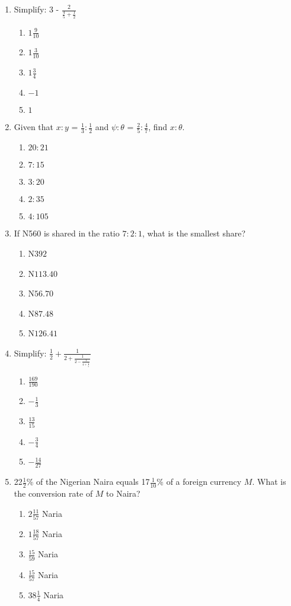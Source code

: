 \begin{multicols}{2}
\begin{enumerate}[label={\arabic*.}]
\begin{enumerate}[label={\Alph*.}]
    \end{enumerate}
\item Simplify: 3 - \(\frac{2}{\frac{4}{5} + \frac{1}{2}}\)
    \begin{enumerate}[label={\Alph*.}]
    \item \(1\frac{9}{10}\)
    \item \(1\frac{3}{10}\)
    \item \(1\frac{3}{4}\)
    \item \(-1\)
    \item \(1\)

    \end{enumerate}
\item Given that \(x:y\) = \(\frac{1}{3}:\frac{1}{2}\) and \(\psi:\theta\) = \(\frac{2}{5}:\frac{4}{7}\), find \(x:\theta\).
    \begin{enumerate}[label={\Alph*.}]
    \item \(20:21\)
    \item \(7:15\)
    \item \(3:20\)
    \item \(2:35\)
    \item \(4:105\)

    \end{enumerate}
\item If N560 is shared in the ratio \(7:2:1\), what is the smallest share?
    \begin{enumerate}[label={\Alph*.}]
    \item N\(392\)
    \item N\(113.40\)
    \item N\(56.70\)
    \item N\(87.48\)
    \item N\(126.41\)

    \end{enumerate}
\item Simplify: \(\frac{1}{2} + \frac{1}{2 + \frac{1}{2 - \frac{1}{4 + \frac{1}{5}}}}\)
    \begin{enumerate}[label={\Alph*.}]
    \item \(\frac{169}{190}\)
    \item \(-\frac{1}{3}\)
    \item \(\frac{13}{15}\)
    \item \(-\frac{3}{4}\)
    \item \(-\frac{14}{27}\)

    \end{enumerate}
\item 22\(\frac{1}{2}\)\% of the Nigerian Naira equals 17\(\frac{1}{10}\)\% of a foreign currency \(M\). What is the conversion rate of \(M\) to Naira?
    \begin{enumerate}[label={\Alph*.}]
    \item \(2\frac{11}{57}\) Naria
    \item \(1\frac{18}{57}\) Naria
    \item \(\frac{15}{59}\) Naria
    \item \(\frac{15}{57}\) Naria
    \item \(38\frac{1}{4}\) Naria


\end{enumerate}
\end{enumerate}
\end{multicols}
